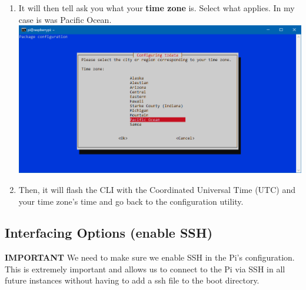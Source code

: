 \documentclass{article}
\begin{document}
\begin{enumerate}
  \item It will then tell ask you what  your \textbf{time zone} is. Select what applies. In my case is was Pacific Ocean.
  \newline
  \newline
  \includegraphics[width=1.00\textwidth]{rctimepo}
  \item Then, it will flash the CLI with the Coordinated Universal Time (UTC) and your time zone's time and go back to the configuration utility.
\end{enumerate}

\subsection{Interfacing Options (enable SSH)}

\textbf{IMPORTANT} We need to make sure we enable SSH in the Pi's configuration. This is extremely important and allows us to connect to the Pi via SSH in all future instances without having to add a ssh file to the boot directory.
\end{document}
